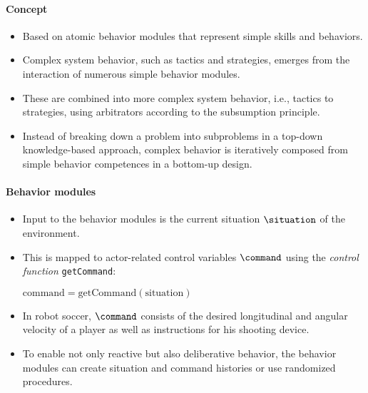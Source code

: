 \paragraph*{Concept}
\begin{itemize}
    \item Based on atomic behavior modules that represent simple skills and behaviors.
    \item Complex system behavior, such as tactics and strategies, emerges from the interaction of numerous simple behavior modules.
    \item These are combined into more complex system behavior, i.e., tactics to strategies, using arbitrators according to the subsumption principle.
    \item Instead of breaking down a problem into subproblems in a top-down knowledge-based approach, complex behavior is iteratively composed from simple behavior competences in a bottom-up design.
\end{itemize}

\paragraph*{Behavior modules}
\begin{itemize}
\item Input to the behavior modules is the current situation $\situation$ of the environment.
\item This is mapped to actor-related control variables $\command$ using the \emph{control function} \texttt{getCommand}:

$\text{command} = \text{getCommand}(\text{situation})$

\item In robot soccer, $\command$ consists of the desired longitudinal and angular velocity of a player as well as instructions for his shooting device.
\item To enable not only reactive but also deliberative behavior, the behavior modules can create situation and command histories or use randomized procedures.
\end{itemize}

